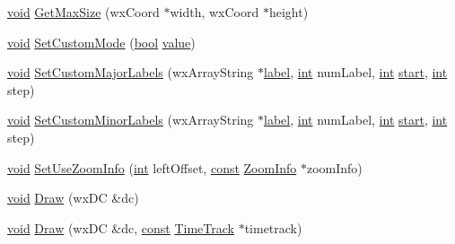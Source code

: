 \begin{DoxyCompactItemize}
\item 
\hyperlink{sound_8c_ae35f5844602719cf66324f4de2a658b3}{void} \hyperlink{class_ruler_abd258d34d82c33e51c066e6ecdab724f}{Get\+Max\+Size} (wx\+Coord $\ast$width, wx\+Coord $\ast$height)
\item 
\hyperlink{sound_8c_ae35f5844602719cf66324f4de2a658b3}{void} \hyperlink{class_ruler_aac774f31f5d90850d8c5e1cf5535b63e}{Set\+Custom\+Mode} (\hyperlink{mac_2config_2i386_2lib-src_2libsoxr_2soxr-config_8h_abb452686968e48b67397da5f97445f5b}{bool} \hyperlink{lib_2expat_8h_a4a30a13b813682e68c5b689b45c65971}{value})
\item 
\hyperlink{sound_8c_ae35f5844602719cf66324f4de2a658b3}{void} \hyperlink{class_ruler_a7287510ef29578717b22ae514983e05c}{Set\+Custom\+Major\+Labels} (wx\+Array\+String $\ast$\hyperlink{_tags_8cpp_a0a3345b0d4574d7adffe113dacd8ccec}{label}, \hyperlink{xmltok_8h_a5a0d4a5641ce434f1d23533f2b2e6653}{int} num\+Label, \hyperlink{xmltok_8h_a5a0d4a5641ce434f1d23533f2b2e6653}{int} \hyperlink{seqread_8c_ac503262ae470564980711da4f78b1181}{start}, \hyperlink{xmltok_8h_a5a0d4a5641ce434f1d23533f2b2e6653}{int} step)
\item 
\hyperlink{sound_8c_ae35f5844602719cf66324f4de2a658b3}{void} \hyperlink{class_ruler_aeb274b2d556df553661d127d818d5abb}{Set\+Custom\+Minor\+Labels} (wx\+Array\+String $\ast$\hyperlink{_tags_8cpp_a0a3345b0d4574d7adffe113dacd8ccec}{label}, \hyperlink{xmltok_8h_a5a0d4a5641ce434f1d23533f2b2e6653}{int} num\+Label, \hyperlink{xmltok_8h_a5a0d4a5641ce434f1d23533f2b2e6653}{int} \hyperlink{seqread_8c_ac503262ae470564980711da4f78b1181}{start}, \hyperlink{xmltok_8h_a5a0d4a5641ce434f1d23533f2b2e6653}{int} step)
\item 
\hyperlink{sound_8c_ae35f5844602719cf66324f4de2a658b3}{void} \hyperlink{class_ruler_a8ff0bef7704ab18dcfd7f5bfba7ad4ac}{Set\+Use\+Zoom\+Info} (\hyperlink{xmltok_8h_a5a0d4a5641ce434f1d23533f2b2e6653}{int} left\+Offset, \hyperlink{getopt1_8c_a2c212835823e3c54a8ab6d95c652660e}{const} \hyperlink{class_zoom_info}{Zoom\+Info} $\ast$zoom\+Info)
\item 
\hyperlink{sound_8c_ae35f5844602719cf66324f4de2a658b3}{void} \hyperlink{class_ruler_aca817fd9b5f108407de382ca3c4ce3e7}{Draw} (wx\+DC \&dc)
\item 
\hyperlink{sound_8c_ae35f5844602719cf66324f4de2a658b3}{void} \hyperlink{class_ruler_a642cb3d41ec031f21ecf4820eddfb0c1}{Draw} (wx\+DC \&dc, \hyperlink{getopt1_8c_a2c212835823e3c54a8ab6d95c652660e}{const} \hyperlink{class_time_track}{Time\+Track} $\ast$timetrack)
\item 

\end{DoxyCompactItemize}

